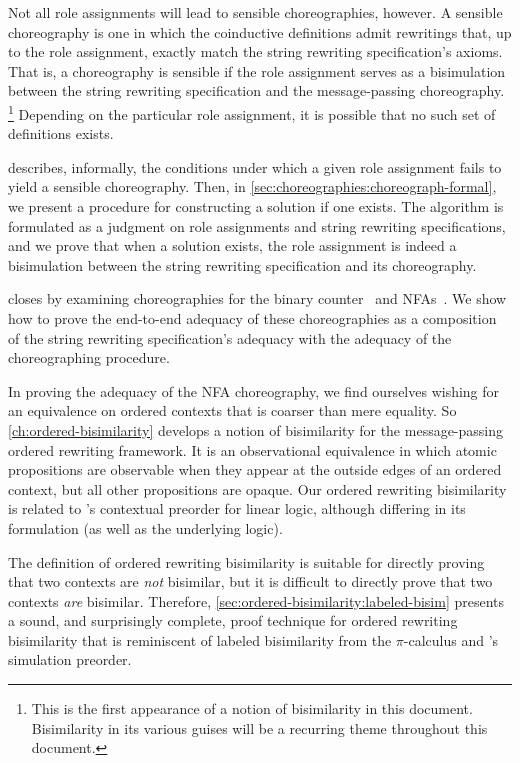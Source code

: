 Not all role assignments will lead to sensible choreographies, however.
A sensible choreography is one in which the coinductive definitions admit rewritings that, up to the role assignment, exactly match the string rewriting specification's axioms.
That is, a choreography is sensible if the role assignment serves as a bisimulation between the string rewriting specification and the message-passing choreography.%
\footnote{This is the first appearance of a notion of bisimilarity in this document.
Bisimilarity in its various guises will be a recurring theme throughout this document.}
Depending on the particular role assignment, it is possible that no such set of definitions exists.

 describes, informally, the conditions under which a given role assignment fails to yield a sensible choreography.
Then, in \cref{sec:choreographies:choreograph-formal}, we present a procedure for constructing a solution if one exists.
The algorithm is formulated as a judgment on role assignments and string rewriting specifications, and we prove that when a solution exists, the role assignment is indeed a bisimulation between the string rewriting specification and its choreography.

 closes by examining choreographies for the binary counter~ and \acsp*{NFA}~.
We show how to prove the end-to-end adequacy of these choreographies as a composition of the string rewriting specification's adequacy with the adequacy of the choreographing procedure.

In proving the adequacy of the \acs*{NFA} choreography, we find ourselves wishing for an equivalence on ordered contexts that is coarser than mere equality.
So \cref{ch:ordered-bisimilarity} develops a notion of bisimilarity for the message-passing ordered rewriting framework.
It is an observational equivalence in which atomic propositions are observable when they appear at the outside edges of an ordered context, but all other propositions are opaque.
Our ordered rewriting bisimilarity is related to \citeauthor{Deng+:MSCS16}'s contextual preorder for linear logic\autocite{Deng+:MSCS16}, although differing in its formulation (as well as the underlying logic).

The definition of ordered rewriting bisimilarity is suitable for directly proving that two contexts are \emph{not} bisimilar, but it is difficult to directly prove that two contexts \emph{are} bisimilar.
Therefore, \cref{sec:ordered-bisimilarity:labeled-bisim} presents a sound, and surprisingly complete, proof technique for ordered rewriting bisimilarity that is reminiscent of labeled bisimilarity from the $\pi$-calculus\autocite{Sangiorgi+Walker:CUP03} and \citeauthor{Deng+:MSCS16}'s simulation preorder\autocite{Deng+:MSCS16}.

